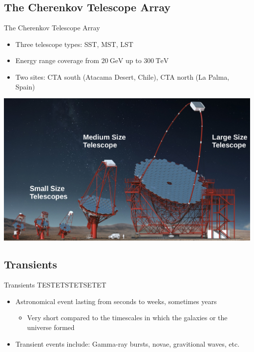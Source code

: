 \subsection{The Cherenkov Telescope Array}
\begin{frame}{The Cherenkov Telescope Array}
  \begin{minipage}{0.48\textwidth}
    \begin{itemize}
      \item Three telescope types: SST, MST, LST
      \item Energy range coverage from $\SI{20}{\giga\eV}$ up to $\SI{300}{\tera\eV}$
      \item Two sites: CTA south (Atacama Desert, Chile), CTA north (La Palma, Spain)
    \end{itemize}
  \end{minipage}
  \begin{minipage}{0.48\textwidth}
    \centering
    \includegraphics[width=\textwidth]{graphics/imagetelescope.png}
  \end{minipage}
\end{frame}


\subsection{Transients}
\begin{frame}{Transients}
  TESTETSTETSETET
  \begin{itemize}
    \item Astronomical event lasting from seconds to weeks, sometimes years
    \begin{itemize}
      \item [\to] Very short compared to the timescales in which the galaxies or the universe formed
    \end{itemize}
    \item Transient events include: Gamma-ray bursts, novae, gravitional waves, etc.
  \end{itemize}
\end{frame}
